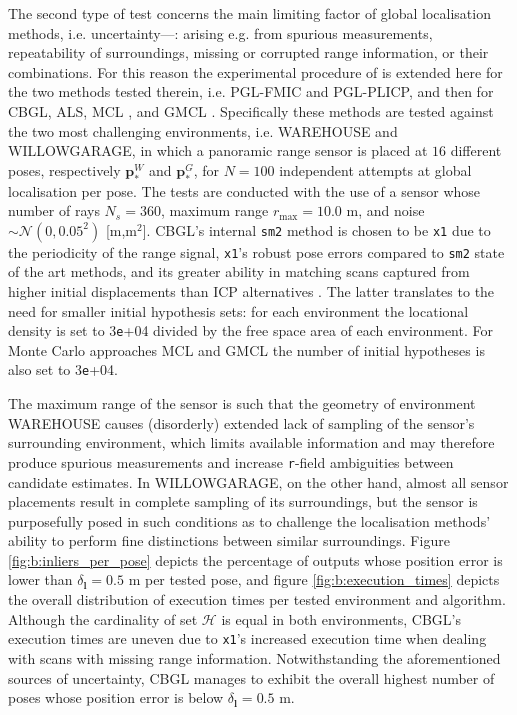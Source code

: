 The second type of test concerns the main limiting factor of global
localisation methods, i.e. uncertainty---: arising e.g. from spurious
measurements, repeatability of surroundings, missing or corrupted range
information, or their combinations. For this reason the experimental procedure
of \cite{Filotheou2022g} is extended here for the two methods tested therein,
i.e.  PGL-FMIC and PGL-PLICP, and then for CBGL, ALS, MCL \cite{mcl}, and GMCL
\cite{gmcl}.  Specifically these methods are tested against the two most
challenging environments, i.e. WAREHOUSE and WILLOWGARAGE, in which a panoramic
range sensor is placed at $16$ different poses, respectively
$\bm{p}_{\ast}^{W}$ and $\bm{p}_{\ast}^{G}$, for $N = 100$ independent attempts
at global localisation per pose. The tests are conducted with the use of a
sensor whose number of rays $N_s = 360$, maximum range $r_{\max} = 10.0$ m, and
noise $\sim \mathcal{N}(0, 0.05^2)$ [m,m$^2$]. CBGL's internal \texttt{sm2} method
is chosen to be \texttt{x1} due to the periodicity of the
range signal, \texttt{x1}'s robust pose errors compared to \texttt{sm2} state
of the art methods, and its greater ability in matching scans captured from
higher initial displacements than ICP alternatives  \cite{Filotheou2023a}. The
latter translates to the need for smaller initial hypothesis sets: for each
environment the locational density is set to $3$\texttt{e}+04 divided by the
free space area of each environment. For Monte Carlo approaches MCL and GMCL
the number of initial hypotheses is also set to $3$\texttt{e}+04.

The maximum range of the sensor is such that the geometry of environment
WAREHOUSE causes (disorderly) extended lack of sampling of the sensor's
surrounding environment, which limits available information and may therefore
produce spurious measurements and increase \texttt{r}-field ambiguities between
candidate estimates. In WILLOWGARAGE, on the other hand, almost all sensor
placements result in complete sampling of its surroundings, but the sensor is
purposefully posed in such conditions as to challenge the localisation methods'
ability to perform fine distinctions between similar surroundings. Figure
\ref{fig:b:inliers_per_pose} depicts the percentage of outputs whose position
error is lower than $\delta_{\bm{l}} = 0.5$ m per tested pose, and figure
\ref{fig:b:execution_times} depicts the overall distribution of execution times
per tested environment and algorithm.
Although the cardinality of set $\mathcal{H}$ is equal in both environments,
CBGL's execution times are uneven due to \texttt{x1}'s increased execution time
when dealing with scans with missing range information. Notwithstanding the
aforementioned sources of uncertainty, CBGL manages to exhibit the overall
highest number of poses whose position error is below $\delta_{\bm{l}} = 0.5$
m.

